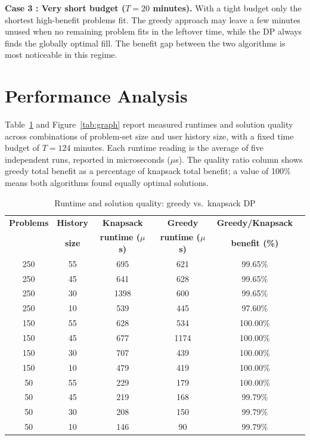 \documentclass{article}
\begin{document}
\textbf{Case 3 : Very short budget ($T = 20$ minutes).}
With a tight budget only the shortest high-benefit problems fit. The
greedy approach may leave a few minutes unused when no remaining
problem fits in the leftover time, while the DP always finds the
globally optimal fill. The benefit gap between the two algorithms is
most noticeable in this regime.

\section{Performance Analysis}

Table~\ref{tab:bench} and Figure~\ref{tab:graph} report measured runtimes and solution quality
across combinations of problem-set size and user history size, with a
fixed time budget of $T = 124$ minutes. Each runtime reading is the
average of five independent runs, reported in microseconds ($\mu$s).
The quality ratio column shows greedy total benefit as a percentage of
knapsack total benefit; a value of 100\% means both algorithms found
equally optimal solutions.

\begin{table}[h]
\centering
\caption{Runtime and solution quality: greedy vs.\ knapsack DP}
\label{tab:bench}
\begin{tabular}{cccccc}
\hline
\textbf{Problems} & \textbf{History} & \textbf{Knapsack} & \textbf{Greedy}
  & \textbf{Greedy/Knapsack} \\
 & \textbf{size} & \textbf{runtime ($\mu$s)} & \textbf{runtime ($\mu$s)}
  & \textbf{benefit (\%)} \\
\hline
250 & 55 & 695  & 621  & 99.65\% \\
250 & 45 & 641  & 628  & 99.65\% \\
250 & 30 & 1398 & 600  & 99.65\% \\
250 & 10 & 539  & 445  & 97.60\% \\
\hline
150 & 55 & 628  & 534  & 100.00\% \\
150 & 45 & 677  & 1174 & 100.00\% \\
150 & 30 & 707  & 439  & 100.00\% \\
150 & 10 & 479  & 419  & 100.00\% \\
\hline
50  & 55 & 229  & 179  & 100.00\% \\
50  & 45 & 219  & 168  & 99.79\% \\
50  & 30 & 208  & 150  & 99.79\% \\
50  & 10 & 146  & 90   & 99.79\% \\
\hline
\end{tabular}
\end{table}
\end{document}
